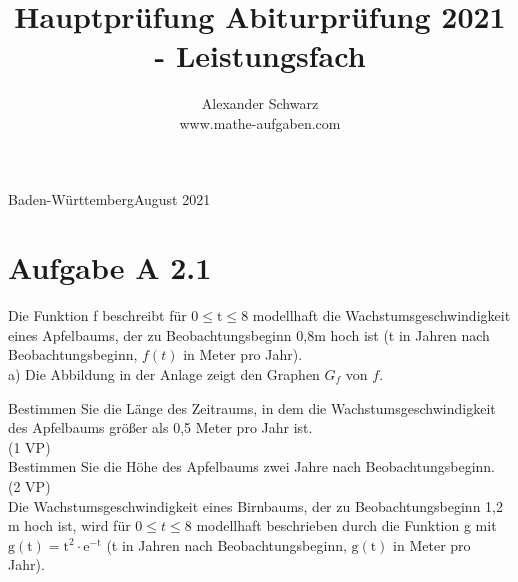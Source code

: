 \documentclass[10pt]{article}
\title{Hauptprüfung Abiturprüfung 2021 - Leistungsfach }
\author{Alexander Schwarz\\
www.mathe-aufgaben.com}
\date{}
\begin{document}
\maketitle
 Baden-WürttembergAugust 2021

\section*{Aufgabe A 2.1}
Die Funktion f beschreibt für $0 \leq \mathrm{t} \leq 8$ modellhaft die Wachstumsgeschwindigkeit eines Apfelbaums, der zu Beobachtungsbeginn 0,8m hoch ist (t in Jahren nach Beobachtungsbeginn, $f(t)$ in Meter pro Jahr).\\
a) Die Abbildung in der Anlage zeigt den Graphen $G_{f}$ von $f$.

Bestimmen Sie die Länge des Zeitraums, in dem die Wachstumsgeschwindigkeit des Apfelbaums größer als 0,5 Meter pro Jahr ist.\\
(1 VP)\\
Bestimmen Sie die Höhe des Apfelbaums zwei Jahre nach Beobachtungsbeginn.\\
(2 VP)\\
Die Wachstumsgeschwindigkeit eines Birnbaums, der zu Beobachtungsbeginn 1,2 m hoch ist, wird für $0 \leq t \leq 8$ modellhaft beschrieben durch die Funktion g mit $\mathrm{g}(\mathrm{t})=\mathrm{t}^{2} \cdot \mathrm{e}^{-\mathrm{t}}$ (t in Jahren nach Beobachtungsbeginn, $\mathrm{g}(\mathrm{t})$ in Meter pro Jahr).
\end{document}
